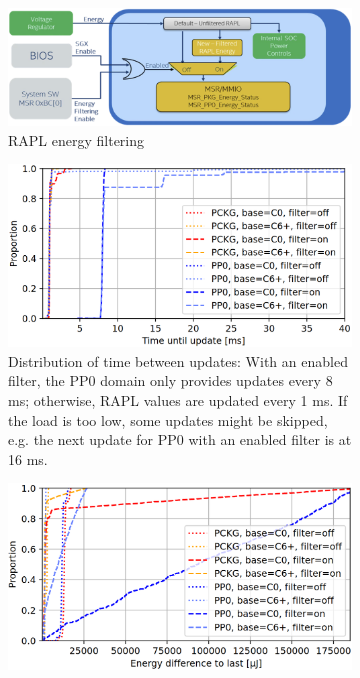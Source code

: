 \begin{itemize}
    \begin{figure}[H]
        \centering
        \begin{subfigure}[t]{0.6\textwidth}
            \includegraphics[width=\textwidth]{Figures/rapl_platypus_filtering.png}
            \caption{RAPL energy filtering\parencite{intel_rapl_guidance}}
            \label{fig:rapl_platypus_filtering}
        \end{subfigure}
        \begin{subfigure}[t]{0.48\textwidth}
            \includegraphics[width=\textwidth]{Figures/rapl_filter_granularity_loss_time.png}
            \caption{Distribution of time between updates: With an enabled filter, the PP0 domain only provides updates every 8 ms; otherwise, RAPL values are updated every 1 ms. If the load is too low, some updates might be skipped, e.g. the next update for PP0 with an enabled filter is at 16 ms.}
            \label{fig:rapl_filter_granularity_loss_time}
        \end{subfigure}
        \hfill
        \begin{subfigure}[t]{0.48\textwidth}
            \includegraphics[width=\textwidth]{Figures/rapl_filter_granularity_loss_energy.png}

\end{subfigure}
\end{figure}
\end{itemize}

